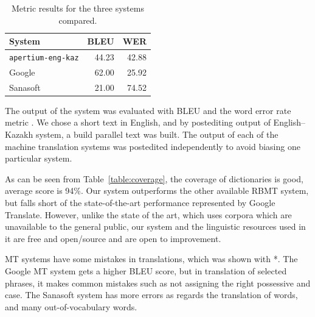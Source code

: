 \documentclass[11pt]{article}
\begin{document}
\begin{table}
  \centering
  \begin{tabular}{|l|r|r|}
    \hline
    \textbf{System} & \textbf{BLEU} & \textbf{WER} \\
    \hline
    \texttt{apertium-eng-kaz} & 44.23 & 42.88 \\
    Google & 62.00 & 25.92 \\
    Sanasoft & 21.00 & 74.52 \\
    \hline
  \end{tabular}
  \caption{Metric results for the three systems compared.}
  \label{table:metrics}
\end{table}

The output of the system was evaluated with BLEU \citep{papineni02} and the word error rate 
metric \citep{levenshtein/1966}. We chose a short text in English, and by postediting output 
of English--Kazakh system, a build parallel text was built. The output of each of the machine
translation systems was postedited independently to avoid biasing one particular system.

As can be seen from Table~\ref{table:coverage}, the coverage of dictionaries is good, average score is 94\%. Our system outperforms the other 
available RBMT system, but falls short of the state-of-the-art performance represented by Google Translate. However, unlike the state of 
the art, which uses corpora which are unavailable to the general public, our system and the linguistic resources used in it are free and open/source and are open to improvement.

MT systems have some mistakes in translations, which was shown with
*. The Google MT system gets a higher BLEU score, but in translation
of selected phrases, it makes common mistakes such as not assigning
the right possessive and case. The Sanasoft system has more errors
as regards the translation of words, and many out-of-vocabulary words.
\end{document}
